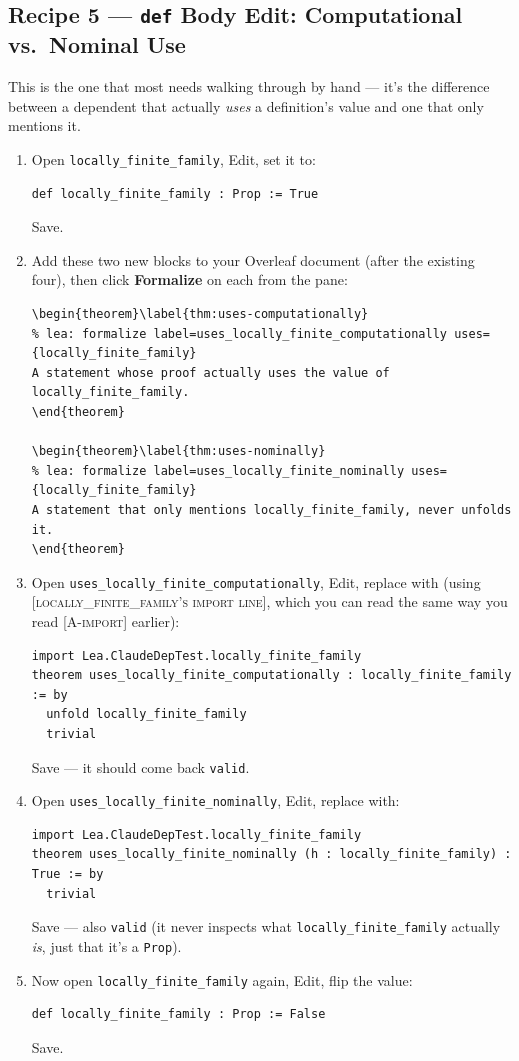 \documentclass[11pt]{article}
\newcommand{\code}[1]{\texttt{#1}}
\begin{document}
\subsection*{Recipe 5 --- \code{def} Body Edit: Computational vs.\ Nominal Use}
This is the one that most needs walking through by hand --- it's the
difference between a dependent that actually \emph{uses} a definition's value
and one that only mentions it.
\begin{enumerate}[label=\arabic*.]
  \item Open \code{locally\_finite\_family}, Edit, set it to:
\begin{verbatim}
def locally_finite_family : Prop := True
\end{verbatim}
    Save.
  \item Add these two new blocks to your Overleaf document (after the
    existing four), then click \textbf{Formalize} on each from the pane:
\begin{verbatim}
\begin{theorem}\label{thm:uses-computationally}
% lea: formalize label=uses_locally_finite_computationally uses={locally_finite_family}
A statement whose proof actually uses the value of locally_finite_family.
\end{theorem}

\begin{theorem}\label{thm:uses-nominally}
% lea: formalize label=uses_locally_finite_nominally uses={locally_finite_family}
A statement that only mentions locally_finite_family, never unfolds it.
\end{theorem}
\end{verbatim}
  \item Open \code{uses\_locally\_finite\_computationally}, Edit, replace with
    (using \textsc{[locally\_finite\_family's import line]}, which you can
    read the same way you read \textsc{[A-import]} earlier):
\begin{verbatim}
import Lea.ClaudeDepTest.locally_finite_family
theorem uses_locally_finite_computationally : locally_finite_family := by
  unfold locally_finite_family
  trivial
\end{verbatim}
    Save --- it should come back \code{valid}.
  \item Open \code{uses\_locally\_finite\_nominally}, Edit, replace with:
\begin{verbatim}
import Lea.ClaudeDepTest.locally_finite_family
theorem uses_locally_finite_nominally (h : locally_finite_family) : True := by
  trivial
\end{verbatim}
    Save --- also \code{valid} (it never inspects what
    \code{locally\_finite\_family} actually \emph{is}, just that it's a
    \code{Prop}).
  \item Now open \code{locally\_finite\_family} again, Edit, flip the value:
\begin{verbatim}
def locally_finite_family : Prop := False
\end{verbatim}
    Save.
\end{enumerate}
\end{document}
